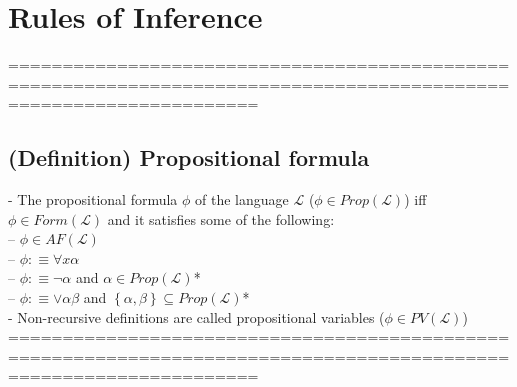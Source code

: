 \documentclass{book}
\newcommand{\is}{:\equiv}
\newcommand{\set}[1]{\left\{ #1 \right\}}
\begin{document}
\section{Rules of Inference}
	===================================================================================================================
\subsection{(Definition) Propositional formula} %
	- The propositional formula $\phi$ of the language $\mathcal{L}$ ($\phi \in Prop(\mathcal{L})$) iff $\phi \in Form(\mathcal{L})$ and it satisfies some of the following: \\
		-- $\phi \in AF(\mathcal{L})$ \\
		-- $\phi \is \forall x \alpha$ \\
		-- $\phi \is \lnot \alpha$ and $\alpha \in Prop(\mathcal{L})$* \\
		-- $\phi \is \lor \alpha \beta$ and $\set{\alpha, \beta} \subseteq Prop(\mathcal{L})$* \\
	- Non-recursive definitions are called propositional variables ($\phi \in PV(\mathcal{L})$) \\
	===================================================================================================================
\end{document}
